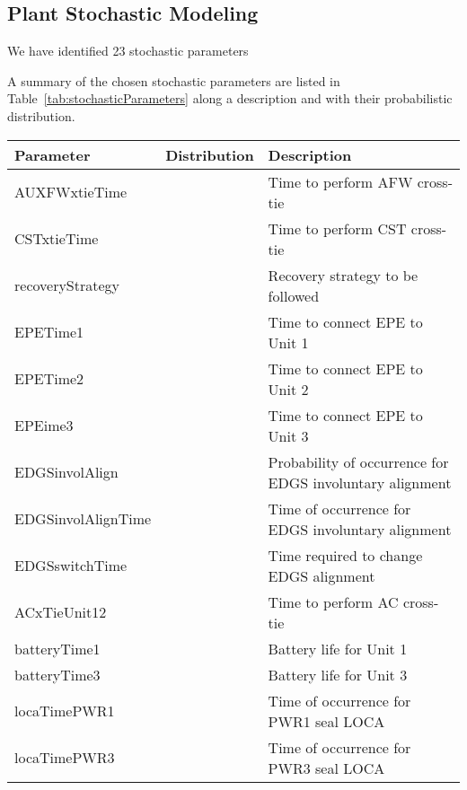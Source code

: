 \subsection{Plant Stochastic Modeling}
We have identified 23 stochastic parameters 

A summary of the chosen stochastic parameters are listed in Table~\ref{tab:stochasticParameters} 
along a description and with their probabilistic distribution.

\begin{table}
  \begin{center}
      \begin{tabular}{ | l | p{5cm} | p{5cm} |}
        \hline
        Parameter          & Distribution & Description                      \\ \hline \hline
        AUXFWxtieTime      &              & Time to perform AFW cross-tie    \\ \hline
        CSTxtieTime        &              & Time to perform CST cross-tie    \\ \hline
        recoveryStrategy   &              & Recovery strategy to be followed \\ \hline
        EPETime1           &              & Time to connect EPE to Unit 1    \\ \hline
        EPETime2           &              & Time to connect EPE to Unit 2    \\ \hline
        EPEime3            &              & Time to connect EPE to Unit 3    \\ \hline
        EDGSinvolAlign     &              & Probability of occurrence for EDGS involuntary alignment   \\ \hline
        EDGSinvolAlignTime &              & Time of occurrence for EDGS involuntary alignment          \\ \hline
        EDGSswitchTime     &              & Time required to change EDGS alignment  \\ \hline
        ACxTieUnit12       &              & Time to perform AC cross-tie     \\ \hline
        batteryTime1       &              & Battery life for Unit 1          \\ \hline
        batteryTime3       &              & Battery life for Unit 3          \\ \hline
        locaTimePWR1       &              & Time of occurrence for PWR1 seal LOCA   \\ \hline
        locaTimePWR3       &              & Time of occurrence for PWR3 seal LOCA   \\ \hline

\end{tabular}
\end{center}
\end{table}
